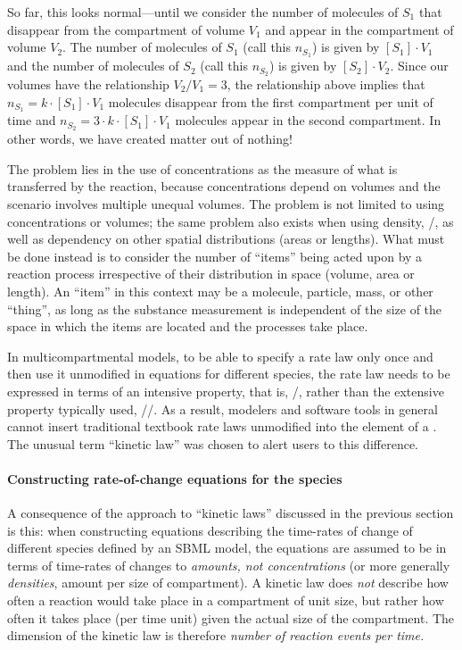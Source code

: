 So far, this looks normal---until we consider the number of
molecules of $S_1$ that disappear from the compartment of volume
$V_1$ and appear in the compartment of volume $V_2$.  The number
of molecules of $S_1$ (call this $n_{S_1}$) is given by $[S_1]
\cdot V_1$ and the number of molecules of $S_2$ (call this
$n_{S_2}$) is given by $[S_2] \cdot V_2$.  Since our volumes have
the relationship $V_2 / V_1 = 3$, the relationship above implies
that $n_{S_1} = k \cdot [S_1] \cdot V_1$ molecules disappear from
the first compartment per unit of time and $n_{S_2} = 3
\cdot k \cdot [S_1] \cdot V_1$ molecules appear in the second
compartment.  In other words, we have created matter out of
nothing!

The problem lies in the use of concentrations as the measure of
what is transferred by the reaction, because concentrations depend
on volumes and the scenario involves multiple unequal volumes.
The problem is not limited to using concentrations or volumes; the
same problem also exists when using density, \ie
{}/, as well as dependency on other
spatial distributions (\ie areas or lengths).  What must be done
instead is to consider the number of ``items'' being acted upon by
a reaction process irrespective of their distribution in space
(volume, area or length).  An ``item'' in this context may be a
molecule, particle, mass, or other ``thing'', as long as the
substance measurement is independent of the size of the space in
which the items are located and the processes take place.

In multicompartmental models, to be able to specify a rate law only
once and then use it unmodified in equations for different
species, the rate law needs to be expressed in terms of an
intensive property, that is, /, rather than the extensive property
typically used, //.  As a result,
modelers and software tools in general cannot insert traditional
textbook rate laws unmodified into the  element of a
\KineticLaw.  The unusual term ``kinetic law'' was chosen to alert
users to this difference.


\paragraph{Constructing rate-of-change equations for the species}
\label{sec:constructing-equations}

A consequence of the approach to ``kinetic laws'' discussed in the
previous section is this: when constructing equations describing
the time-rates of change of different species defined by an SBML
model, the equations are assumed to be in terms of time-rates of
changes to \emph{amounts, not concentrations} (or more
generally \emph{densities}, \ie amount per size of compartment).
A kinetic law does \emph{not} describe how often a reaction would
take place in a compartment of unit size, but rather how often it
takes place (per time unit) given the actual size of the
compartment.  The dimension of the kinetic law is therefore
\emph{number of reaction events per time.}


